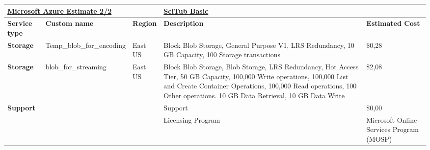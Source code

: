 \begin{adjustbox}{angle=90}
    \begin{tabularx}{\textheight}{|l|X|X|X|X|}        %
    \hline
    \multicolumn{3}{|l|}{{\ul \textbf{Microsoft Azure Estimate 2/2}}}                     & {\ul \textbf{SciTub Basic}}                                                                                                                                                                                                                      & {\ul \textbf{}}                          \\ \hline
    \textbf{Service type}             & \textbf{Custom name}      & \textbf{Region} & \textbf{Description}                                                                                                                                                                                                                             & \textbf{Estimated Cost}                  \\ \hline\hline
    \textbf{Storage}                  & Temp\_blob\_for\_encoding & East US         & Block Blob Storage, General Purpose V1, LRS Redundancy, 10 GB Capacity, 100 Storage transactions                                                                                                                                                 & \$0,28                                   \\ \hline
\textbf{Storage}                  & blob\_for\_streaming      & East US         & Block Blob Storage, Blob Storage, LRS Redundancy, Hot Access Tier, 50 GB Capacity, 100,000 Write operations, 100,000 List and Create Container Operations, 100,000 Read operations, 100 Other operations. 10 GB Data Retrieval, 10 GB Data Write & \$2,08                                   \\ \hline
\textbf{Support}                  &                           &                 & Support                                                                                                                                                                                                                                          & \$0,00                                   \\ \hline
                                        &                           &                 & Licensing Program                                                                                                                                                                                                                                & Microsoft Online Services Program (MOSP) \\ \hline

\end{tabularx}
\end{adjustbox}
